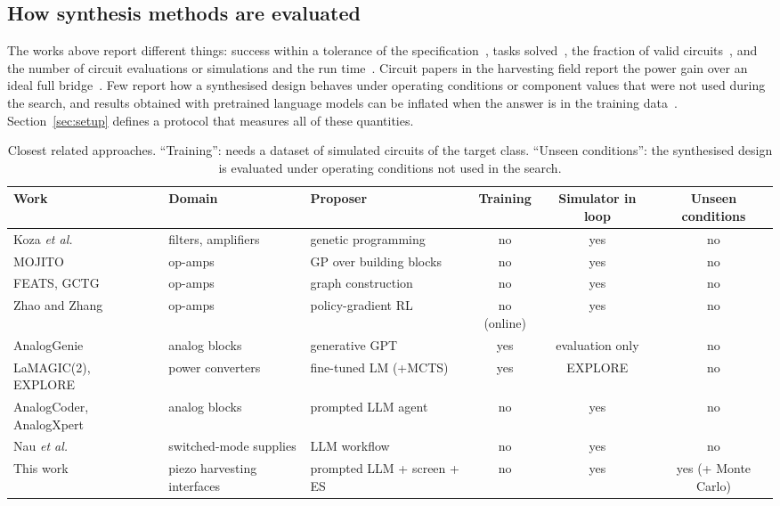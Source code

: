 \documentclass[journal]{IEEEtran}
\begin{document}
\subsection{How synthesis methods are evaluated}
The works above report different things: success within a tolerance of the
specification~\cite{chang2024lamagic,zhang2024analogxpert}, tasks solved~\cite{lai2025analogcoder,nau2025smps},
the fraction of valid circuits~\cite{gao2025analoggenie}, and the number of circuit evaluations or
simulations and the run time~\cite{koza1997analog,zhao2022drl}. Circuit papers in the harvesting field
report the power gain over an ideal full bridge~\cite{ramadass2010biasflip,peng2019senseset}. Few report
how a synthesised design behaves under operating conditions or component values that were not used
during the search, and results obtained with pretrained language models can be inflated when the
answer is in the training data~\cite{xu2024contamination}. Section~\ref{sec:setup} defines a protocol that
measures all of these quantities.

\begin{table}[t]
\centering\footnotesize
\caption{Closest related approaches. ``Training'': needs a dataset of simulated circuits of the target class.
``Unseen conditions'': the synthesised design is evaluated under operating conditions not used in the search.}
\label{tab:related}
\begin{tabular}{lllccc}
\toprule
Work & Domain & Proposer & Training & Simulator in loop & Unseen conditions \\
\midrule
Koza \emph{et al.}~\cite{koza1997analog} & filters, amplifiers & genetic programming & no & yes & no \\
MOJITO~\cite{mcconaghy2011mojito} & op-amps & GP over building blocks & no & yes & no \\
FEATS, GCTG~\cite{meissner2015feats,zhao2020gctg} & op-amps & graph construction & no & yes & no \\
Zhao and Zhang~\cite{zhao2022drl} & op-amps & policy-gradient RL & no (online) & yes & no \\
AnalogGenie~\cite{gao2025analoggenie} & analog blocks & generative GPT & yes & evaluation only & no \\
LaMAGIC(2), EXPLORE~\cite{chang2024lamagic,chang2025lamagic2,zhou2026explore} & power converters & fine-tuned LM (+MCTS) & yes & EXPLORE & no \\
AnalogCoder, AnalogXpert~\cite{lai2025analogcoder,zhang2024analogxpert} & analog blocks & prompted LLM agent & no & yes & no \\
Nau \emph{et al.}~\cite{nau2025smps} & switched-mode supplies & LLM workflow & no & yes & no \\
This work & piezo harvesting interfaces & prompted LLM + screen + ES & no & yes & yes (+ Monte Carlo) \\
\bottomrule
\end{tabular}
\end{table}
\end{document}
